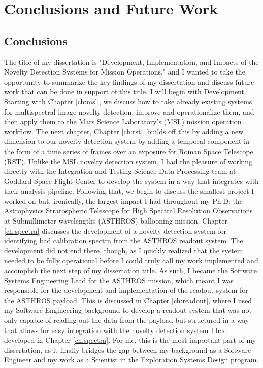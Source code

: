 \chapter{Conclusions and Future Work}
\label{ch:conclusion}
\section{Conclusions}
The title of my dissertation is  "Development, Implementation, and Impacts of the Novelty Detection Systems for Mission Operations," and I wanted to take the opportunity to summarize the key findings of my dissertation and discuss future work that can be done in support of this title. 
I will begin with Development. 
Starting with Chapter \ref{ch:msl}, we discuss how to take already existing systems for multispectral image novelty detection, improve and operationalize them, and then apply them to the Mars Science Laboratory's (MSL) mission operation workflow.
The next chapter, Chapter \ref{ch:rst}, builds off this by adding a new dimension to our novelty detection system by adding a temporal component in the form of a time series of frames over an exposure for Roman Space Telescope (RST).
Unlike the MSL novelty detection system, I had the pleasure of working directly with the Integration and Testing Science Data Processing team at Goddard Space Flight Center to develop the system in a way that integrates with their analysis pipeline.
Following that, we begin to discuss the smallest project I worked on but, ironically, the largest impact I had throughout my Ph.D: the Astrophysics Stratospheric Telescope for High Spectral Resolution Observations at Submillimeter-wavelengths (ASTHROS) ballooning mission. 
Chapter \ref{ch:spectra} discusses the development of a novelty detection system for identifying bad calibration spectra from the ASTHROS readout system.
The development did not end there, though, as I quickly realized that the system needed to be fully operational before I could truly call my work implemented and accomplish the next step of my dissertation title.
As such, I became the Software Systems Engineering Lead for the ASTHROS mission, which meant I was responsible for the development and implementation of the readout system for the ASTHROS payload.
This is discussed in Chapter \ref{ch:readout}, where I used my Software Engineering background to develop a readout system that was not only capable of reading out the data from the payload but structured in a way that allows for easy integration with the novelty detection system I had developed in Chapter \ref{ch:spectra}.
For me, this is the most important part of my dissertation, as it finally bridges the gap between my background as a Software Engineer and my work as a Scientist in the Exploration Systems Design program.

